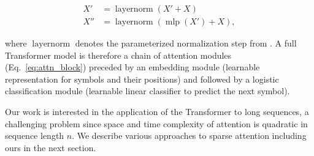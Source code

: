 \begin{align}
X' &= \operatorname{layernorm}(X' + X)\\
X'' &= \operatorname{layernorm}(\operatorname{mlp}(X') + X),
\label{eq:attn_block}
\end{align}

where $\operatorname{layernorm}$ denotes the parameterized normalization step from \cite{layernorm2016}. A full Transformer model is therefore a chain of attention modules (Eq.~\ref{eq:attn_block}) preceded by an embedding module (learnable representation for symbols and their positions) and followed by a logistic classification module (learnable linear classifier to predict the next symbol).

Our work is interested in the application of the Transformer to long sequences, a challenging problem since space and time complexity of attention is quadratic in sequence length \(n\). We describe various approaches to sparse attention including ours in the next section.

